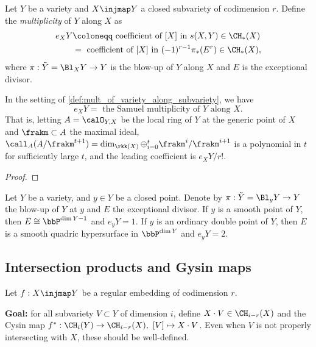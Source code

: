   \begin{definition}\label{def:mult_of_variety_along_subvariety}
    Let $Y$ be a variety and $X \injmap Y$ a closed subvariety of codimension $r$.
    Define the \emph{multiplicity} of $Y$ along $X$ as
    \begin{align*}
        e_X Y &\coloneqq \text{ coefficient of } [X] \text{ in } s(X,Y) \in \CH_*(X) \\
        &= \text{ coefficient of } [X] \text{ in } (-1)^{r-1} \pi_*(E^{r}) \in \CH_*(X),
    \end{align*}
    where $\pi: \tilde{Y} = \Bl_X Y \to Y$ is the blow-up of $Y$ along $X$ and $E$ is the exceptional divisor.
  \end{definition}

  \begin{lemma}
    In the setting of \cref{def:mult_of_variety_along_subvariety}, we have 
    \[ e_X Y = \text{ the Samuel multiplicity of } Y \text{ along } X. \]
    That is, letting $A = \calO_{Y,X}$ be the local ring of $Y$ at the generic point of $X$ and $\frakm \subset A$ the maximal ideal, $\call_A(A/\frakm^{t+1}) = \dim_{\rkk(X)} \oplus_{i=0}^t \frakm^i/\frakm^{i+1}$ is a polynomial in $t$ for sufficiently large $t$, and the leading coefficient is $e_X Y / r!$.
  \end{lemma}
  \begin{proof}
    \Yang{}
  \end{proof}

  \begin{example}
    Let $Y$ be a variety, and $y \in Y$ be a closed point.
    Denote by $\pi: \tilde{Y} = \Bl_y Y \to Y$ the blow-up of $Y$ at $y$ and $E$ the exceptional divisor.
    If $y$ is a smooth point of $Y$, then $E \cong \bbP^{\dim Y - 1}$ and $e_y Y = 1$.
    If $y$ is an ordinary double point of $Y$, then $E$ is a smooth quadric hypersurface in $\bbP^{\dim Y}$ and $e_y Y = 2$.
  \end{example}


\subsection{Intersection products and Gysin maps}

  Let $f: X \injmap Y$ be a regular embedding of codimension $r$.

  \textbf{Goal:} for all subvariety $V \subset Y$ of dimension $i$, define $X \cdot V \in \CH_{i-r}(X)$ and the Cysin map $f^*: \CH_i(Y) \to \CH_{i-r}(X),\ [V] \mapsto X \cdot V$. 
  Even when $V$ is not properly intersecting with $X$, these should be well-defined.

